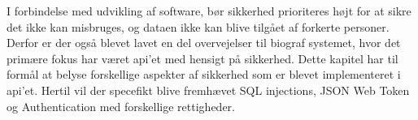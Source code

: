 ﻿I forbindelse med udvikling af software, bør sikkerhed prioriteres højt for at sikre det ikke kan misbruges, 
og dataen ikke kan blive tilgået af forkerte personer. Derfor er der også blevet lavet en del overvejelser 
til biograf systemet, hvor det primære fokus har været api'et med hensigt på sikkerhed.
Dette kapitel har til formål at belyse forskellige aspekter af sikkerhed som er blevet implementeret i api'et.
Hertil vil der specefikt blive fremhævet SQL injections, JSON Web Token og Authentication med forskellige rettigheder.